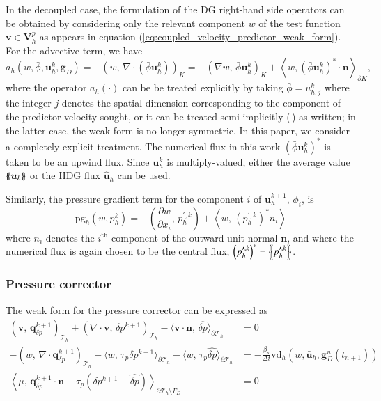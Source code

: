 In the decoupled case, the formulation of the DG right-hand side operators can be obtained by considering only the relevant component $w$ of the test function $\bm{v}\in \bm{V}_h^p$ as appears in equation (\ref{eq:coupled_velocity_predictor_weak_form}). 
For the advective term, we have 
\begin{equation}
  a_h(w,\bar{\phi}, \bm{u}_h^k, \bm{g}_D) 
  = -\left(w,\, \nabla \cdot \left( \bar{\phi}\bm{u}_h^k \right)\right)_K
   = - \left(\nabla w,\, \bar{\phi}\bm{u}^k_h\right)_K
   + \left\langle w, \left(\bar{\phi}\bm{u}_h^k\right)^* \cdot\bm{n} \right\rangle_{\partial K},
\end{equation}
where the operator $a_h(\cdot)$ can be be treated explicitly by taking $\bar{\phi} = u^k_{h,j}$ where the integer $j$ denotes the spatial dimension corresponding to the component of the predictor velocity sought, or it can be treated semi-implicitly (\cf  \,\cite{nguyen_implicit_2009}) as written; in the latter case, the weak form is no longer symmetric.
In this paper, we consider a completely explicit treatment.
The numerical flux in this work $\left(\bar{\phi}\bm{u}_h^k\right)^*$ is taken to be an upwind flux.
Since $\bm{u}_h^k$ is multiply-valued, either the average value $\left\{\!\left\{\bm{u}_h\right\}\!\right\}$ or the HDG flux $\hat{\bm{u}}_h$ can be used.

Similarly, the pressure gradient term for the component $i$ of $\bar{\bm{u}}_h^{k+1}$, $\bar{\phi}_i$, is
\begin{equation}
  \text{pg}_h\left(w,p_h^k\right) = 
    - \left(\frac{\partial w}{\partial x_i},\, p^{\prime,k}_h\right)
    + \left\langle w,\, \left(p^{\prime, k}_h\right)^*n_i \right\rangle
\end{equation}
where $n_i$ denotes the $i^{\text{th}}$ component of the outward unit normal $\bm{n}$, and where the numerical flux is again chosen to be the central flux, $\left(p^{\prime, k}_h\right)^* = \left\{\!\left\{p_h^{\prime,k}\right\}\!\right\}$.

\subsubsection{Pressure corrector}%
The weak form for the pressure corrector can be expressed as 
\begin{equation}
\begin{aligned}
(\bm{v},\,  \bm{q}_{\delta p}^{k+1})_{\mathcal{T}_h}
+ ( \nabla \cdot \bm{v} ,\, \delta p^{k+1})_{\mathcal{T}_h}
- \langle \bm{v}\cdot\bm{n} ,\, \widehat{\delta p} \rangle_{\partial \mathcal{T}_h} &= 0 \\
-(w ,\, \nabla \cdot \bm{q}_{\delta p}^{k+1})_{\mathcal{T}_h}
+ \langle w,\, \tau_p \delta p^{k+1}\rangle_{\partial \mathcal{T}_h} 
- \langle w,\, \tau_p \widehat{\delta p} \rangle_{\partial \mathcal{T}_h} 
&= - \frac{\beta_s}{\Delta t} \text{vd}_h(w,\bar{\bm{u}}_h, \bm{g}_D^u(t_{n+1}))  \\
\left\langle \mu ,\, \bm{q}_{\delta p}^{k+1} \cdot\bm{n} + \tau_p(\delta p^{k+1} - \widehat{\delta p})
\right\rangle_{\partial \mathcal{T}_h \setminus \Gamma_D} &= 0 
\end{aligned}
\end{equation}


